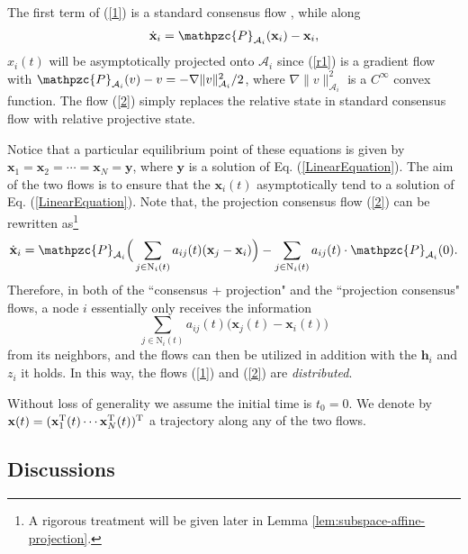 \documentclass[a4paper, 11pt]{article}
\def\T{^{\rm\tiny T}}
\begin{document}
The first term of (\ref{1}) is a standard  consensus flow \cite{jad03}, while along
\begin{align}\label{r1}
 \dot{\mathbf{x}}_i= \mathpzc{P}_{\mathcal{A}_i}(\mathbf{x}_i)-\mathbf{x}_i,
\end{align}
$x_i(t)$ will be asymptotically projected onto ${\mathcal{A}_i}$ since (\ref{r1}) is a gradient flow with $\mathpzc{P}_{\mathcal{A}_i}(v)-v =- \nabla \|v\|_{\mathcal{A}_i}^2/2$, where $\nabla \|v\|_{\mathcal{A}_i}^2$ is a  $C^\infty$ convex function. The flow (\ref{2}) simply replaces the relative state in standard consensus flow with relative projective state.


Notice that a particular equilibrium point of these equations is given by  $\mathbf{x}_1=\mathbf{x}_2=\cdots=\mathbf{x}_N=\mathbf{y}$, where $\mathbf{y}$ is a solution of Eq. (\ref{LinearEquation}). The aim of the two flows is to ensure that the $\mathbf{x}_i(t)$ asymptotically tend to a solution of Eq. (\ref{LinearEquation}). Note that, the projection consensus flow (\ref{2}) can be rewritten as\footnote{A rigorous treatment will be given later in Lemma \ref{lem:subspace-affine-projection}.}
\begin{align*}
\dot{\mathbf{x}}_i =  \mathpzc{P}_{\mathcal{A}_i}\Big( \sum_{j\in \mathrm{N}_i(t)}a_{ij}(t)(\mathbf{x}_j-\mathbf{x}_i)\Big) -  \sum_{j\in \mathrm{N}_i(t)}a_{ij}(t)\cdot\mathpzc{P}_{\mathcal{A}_i}(0).
\end{align*}
Therefore, in both of the ``consensus + projection" and the  ``projection consensus" flows, a node $i$ essentially only receives the information
$$
 \sum_{j\in \mathrm{N}_i(t)}a_{ij}(t)\big(\mathbf{x}_j(t)-\mathbf{x}_i(t)\big)
$$
from its  neighbors, and the flows can then be utilized in addition with the $\mathbf{h}_i$ and $z_i$ it holds. In this way,   the  flows (\ref{1}) and (\ref{2}) are {\it distributed}.

Without loss of generality we assume the initial time is $t_0=0$. We denote by  $\mathbf{x}(t)=(\mathbf{x}_1\T(t) \cdots \mathbf{x}_N\T(t))\T$ a trajectory along any of the two flows.

\subsection{Discussions}
\end{document}

